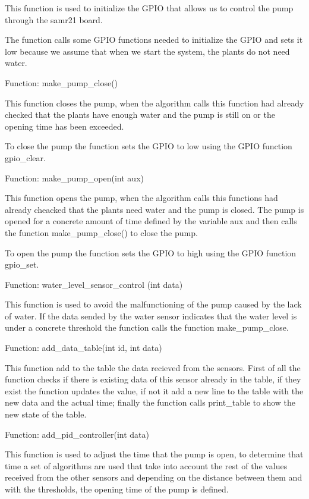 \documentclass[11pt,paper=a4,parskip=half]{scrartcl}
\begin{document}
This function is used to initialize the GPIO that allows us to control the pump through the samr21 board.

The function calls some GPIO functions needed to initialize the GPIO and sets it low because we assume that when we start the system, the plants do not need water.

Function: make\_pump\_close()

This function closes the pump, when the algorithm calls this function had already checked that the plants have enough water and the pump is still on or the opening time has been exceeded.

To close the pump the function sets the GPIO to low using the GPIO function gpio\_clear.

Function: make\_pump\_open(int aux)

This function opens the pump, when the algorithm calls this functions had already cheacked that the plants need water and the pump is closed. The pump is opened for a concrete amount of time defined by the variable aux and then calls the function make\_pump\_close() to close the pump.

To open the pump the function sets the GPIO to high using the GPIO function gpio\_set.

Function: water\_level\_sensor\_control (int data)

This function is used to avoid the malfunctioning of the pump caused by the lack of water. If the data sended by the water sensor indicates that the water level is under a concrete threshold the function calls the function make\_pump\_close.

Function: add\_data\_table(int id, int data)

This function add to the table the data recieved from the sensors. First of all the function checks if there is existing data of this sensor already in the table, if they exist the function updates the value, if not it add a new line to the table with the new data and the actual time; finally the function calls print\_table to show the new state of the table.

Function: add\_pid\_controller(int data)

This function is used to adjust the time that the pump is open, to determine that time a set of algorithms are used that take into account the rest of the values received from the other sensors and depending on the distance between them and with the thresholds, the opening time of the pump is defined.
\end{document}
